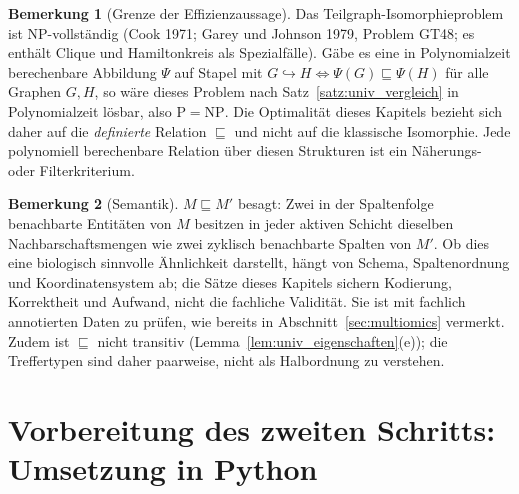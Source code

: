 \documentclass[a4paper,12pt, twoside]{report}
\theoremstyle{definition}
\newtheorem{bemerkung}{Bemerkung}
\begin{document}
\begin{bemerkung}[Grenze der Effizienzaussage]
	\label{bem:univ_np}
	Das Teilgraph-Isomorphieproblem ist NP-vollständig (Cook 1971; Garey und Johnson 1979, Problem GT48; es enthält Clique und Hamiltonkreis als Spezialfälle). Gäbe es eine in Polynomialzeit berechenbare Abbildung $\Psi$ auf Stapel mit $G\hookrightarrow H\iff\Psi(G)\sqsubseteq\Psi(H)$ für alle Graphen $G,H$, so wäre dieses Problem nach Satz~\ref{satz:univ_vergleich} in Polynomialzeit lösbar, also $\mathrm{P}=\mathrm{NP}$. Die Optimalität dieses Kapitels bezieht sich daher auf die \emph{definierte} Relation $\sqsubseteq$ und nicht auf die klassische Isomorphie. Jede polynomiell berechenbare Relation über diesen Strukturen ist ein Näherungs- oder Filterkriterium.
\end{bemerkung}

\begin{bemerkung}[Semantik]
	\label{bem:univ_semantik}
	$M\sqsubseteq M'$ besagt: Zwei in der Spaltenfolge benachbarte Entitäten von $M$ besitzen in jeder aktiven Schicht dieselben Nachbarschaftsmengen wie zwei zyklisch benachbarte Spalten von $M'$. Ob dies eine biologisch sinnvolle Ähnlichkeit darstellt, hängt von Schema, Spaltenordnung und Koordinatensystem ab; die Sätze dieses Kapitels sichern Kodierung, Korrektheit und Aufwand, nicht die fachliche Validität. Sie ist mit fachlich annotierten Daten zu prüfen, wie bereits in Abschnitt~\ref{sec:multiomics} vermerkt. Zudem ist $\sqsubseteq$ nicht transitiv (Lemma~\ref{lem:univ_eigenschaften}(e)); die Treffertypen sind daher paarweise, nicht als Halbordnung zu verstehen.
\end{bemerkung}

\section{Vorbereitung des zweiten Schritts: Umsetzung in Python}
\label{sec:univ_umsetzung}
\end{document}
